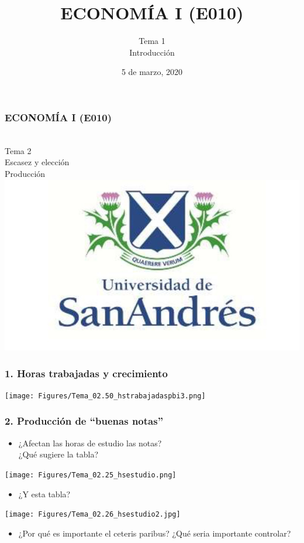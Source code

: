 \documentclass[14pt]{beamer}
\title{ECONOM\'{I}A I (E010)}
\subtitle{Tema 1 \\ Introducción}
\date{5 de marzo, 2020}
\begin{document}

\begin{frame}
\frametitle{ECONOM\'{I}A I (E010)}
\centering
\\ \vspace{4mm} Tema 2 \\ Escasez y elección \\ \vspace{4mm} Producción \\ \vspace{4mm}
\includegraphics[scale=0.25]{Figures/logoUDESA.jpg} 
\end{frame}

\begin{frame}
\frametitle{1. Horas trabajadas y crecimiento}
\begin{center}
    \texttt{[image: Figures/Tema\_02.50\_hstrabajadaspbi3.png]}
\end{center}
\end{frame}

\begin{frame}
\frametitle{2. Producción de ``buenas notas'' }
\begin{itemize}
    \item ¿Afectan las horas de estudio las notas? \\
    ¿Qué sugiere la tabla? 
\end{itemize} 
\centering
\texttt{[image: Figures/Tema\_02.25\_hsestudio.png]}
\begin{itemize}
    \item ¿Y esta tabla? 
\end{itemize} 
\centering
\texttt{[image: Figures/Tema\_02.26\_hsestudio2.jpg]}
\begin{itemize}
    \item ¿Por qué es importante el ceteris paribus? ¿Qué seria importante controlar? 
\end{itemize} 
\end{frame}
\end{document}

